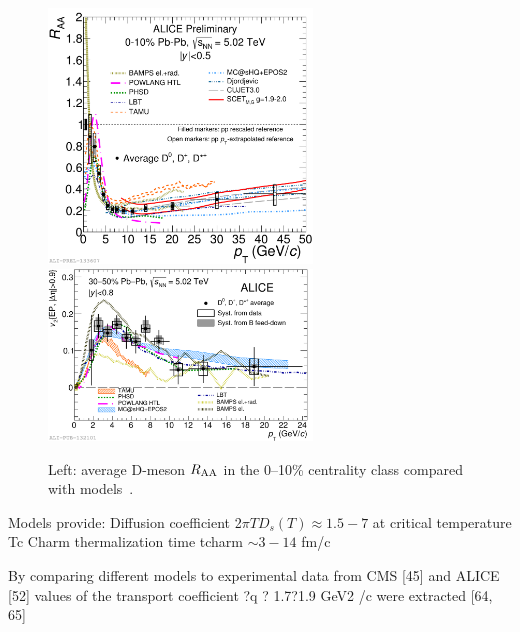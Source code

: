 \begin{figure}[!ht]
  \centering
    \includegraphics[width=7cm]{FigCap2/2017-Jul-07-DmesonAverage_010_All_Models_04July2017.pdf}
    \includegraphics[width=7cm]{FigCap2/2017-Jul-04-DmesonComparisonWithModels.pdf}
  \caption{Left: average D-meson $R_{\rm AA}$ in the 0--10\% centrality class compared with models~\cite{ALICE-PUBLIC-2017-003}.}
  \label{fig:}
\end{figure}

Models provide:
Diffusion coefficient 2$\pi T D_s(T) \approx 1.5-7$ at critical temperature Tc
Charm thermalization time tcharm $\sim 3-14$ fm/c

 By comparing different models to experimental data from CMS [45] and ALICE [52] values of the
transport coefficient ?q ? 1.7?1.9 GeV2
/c were extracted [64, 65]
